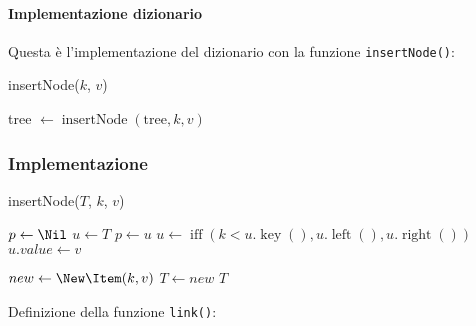         \paragraph{Implementazione dizionario} Questa è l'implementazione del dizionario con la funzione \texttt{insertNode()}:
        \begin{algorithm}[H]
            \caption{insertNode(\Item $ k $, \Item $ v $)}
            \begin{algorithmic}
                \State tree $\gets \operatorname{insertNode}(\text{tree}, k, v)$
            \end{algorithmic}
        \end{algorithm}
        \subsubsection{Implementazione}
            \begin{algorithm}[H]
                \caption{\Tree insertNode(\Tree $ T $, \Item $ k $, \Item $ v $)}
                \begin{algorithmic}
                    \State \Tree $ p \gets \Nil $
                    \State \Tree $ u \gets T $
                        \State $ p \gets u $
                        \State $ u \gets \operatorname{iff}(k<u.\operatorname{key}(), u.\operatorname{left}(), u.\operatorname{right}()) $
                    \EndWhile
                        \State $ u.value \gets v $
                \end{algorithmic}
            \end{algorithm}
            \begin{algorithm}[H]
                \begin{algorithmic}
                    \Else
                        \State \Tree $ new \gets \New \Item(k, v)$
                            \State $ T \gets new $
                        \EndIf
                    \EndIf
                    \State \Return $ T $
                \end{algorithmic}
            \end{algorithm}
            Definizione della funzione \texttt{link()}:
